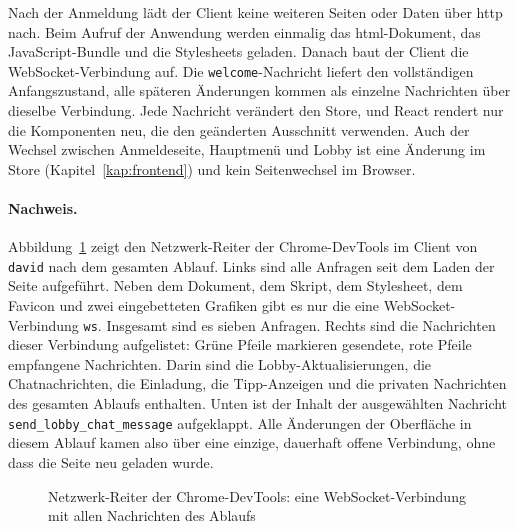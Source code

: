 Nach der Anmeldung lädt der Client keine weiteren Seiten oder Daten über \gls{http} nach. Beim Aufruf der Anwendung werden einmalig das \gls{html}-Dokument, das JavaScript-Bundle und die Stylesheets geladen. Danach baut der Client die WebSocket-Verbindung auf. Die \texttt{welcome}-Nachricht liefert den vollständigen Anfangszustand, alle späteren Änderungen kommen als einzelne Nachrichten über dieselbe Verbindung. Jede Nachricht verändert den Store, und React rendert nur die Komponenten neu, die den geänderten Ausschnitt verwenden. Auch der Wechsel zwischen Anmeldeseite, Hauptmenü und Lobby ist eine Änderung im Store (Kapitel~\ref{kap:frontend}) und kein Seitenwechsel im Browser.

\paragraph{Nachweis.} Abbildung~\ref{fig:devtools-messages} zeigt den Netzwerk-Reiter der Chrome-DevTools im Client von \texttt{david} nach dem gesamten Ablauf. Links sind alle Anfragen seit dem Laden der Seite aufgeführt. Neben dem Dokument, dem Skript, dem Stylesheet, dem Favicon und zwei eingebetteten Grafiken gibt es nur die eine WebSocket-Verbindung \texttt{ws}. Insgesamt sind es sieben Anfragen. Rechts sind die Nachrichten dieser Verbindung aufgelistet: Grüne Pfeile markieren gesendete, rote Pfeile empfangene Nachrichten. Darin sind die Lobby-Aktualisierungen, die Chatnachrichten, die Einladung, die Tipp-Anzeigen und die privaten Nachrichten des gesamten Ablaufs enthalten. Unten ist der Inhalt der ausgewählten Nachricht \texttt{send\_lobby\_chat\_message} aufgeklappt. Alle Änderungen der Oberfläche in diesem Ablauf kamen also über eine einzige, dauerhaft offene Verbindung, ohne dass die Seite neu geladen wurde.

\begin{figure}[ht]
  \centering
  \caption{Netzwerk-Reiter der Chrome-DevTools: eine WebSocket-Verbindung mit allen Nachrichten des Ablaufs}
  \label{fig:devtools-messages}
\end{figure}
